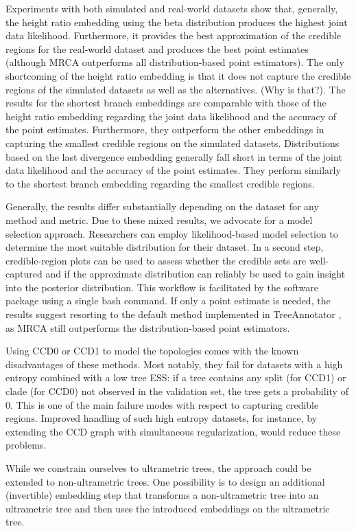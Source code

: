 \documentclass[10pt,letterpaper]{article}
\begin{document}
Experiments with both simulated and real-world datasets show that, generally, the height ratio embedding using the beta distribution produces the highest joint data likelihood. Furthermore, it provides the best approximation of the credible regions for the real-world dataset and produces the best point estimates (although MRCA outperforms all distribution-based point estimators). The only shortcoming of the height ratio embedding is that it does not capture the credible regions of the simulated datasets as well as the alternatives. (Why is that?). The results for the shortest branch embeddings are comparable with those of the height ratio embedding regarding the joint data likelihood and the accuracy of the point estimates. Furthermore, they outperform the other embeddings in capturing the smallest credible regions on the simulated datasets. Distributions based on the last divergence embedding generally fall short in terms of the joint data likelihood and the accuracy of the point estimates. They perform similarly to the shortest branch embedding regarding the smallest credible regions.

Generally, the results differ substantially depending on the dataset for any method and metric. Due to these mixed results, we advocate for a model selection approach. Researchers can employ likelihood-based model selection to determine the most suitable distribution for their dataset. In a second step, credible-region plots can be used to assess whether the credible sets are well-captured and if the approximate distribution can reliably be used to gain insight into the posterior distribution. This workflow is facilitated by the software package using a single bash command. If only a point estimate is needed, the results suggest resorting to the default method implemented in TreeAnnotator \cite{treeannotator}, as MRCA still outperforms the distribution-based point estimators.

Using CCD0 or CCD1 to model the topologies comes with the known disadvantages of these methods. Most notably, they fail for datasets with a high entropy combined with a low tree ESS: if a tree contains any split (for CCD1) or clade (for CCD0) not observed in the validation set, the tree gets a probability of $0$. This is one of the main failure modes with respect to capturing credible regions. Improved handling of such high entropy datasets, for instance, by extending the CCD graph with simultaneous regularization, would reduce these problems.

While we constrain ourselves to ultrametric trees, the approach could be extended to non-ultrametric trees. One possibility is to design an additional (invertible) embedding step that transforms a non-ultrametric tree into an ultrametric tree and then uses the introduced embeddings on the ultrametric tree.
\end{document}
